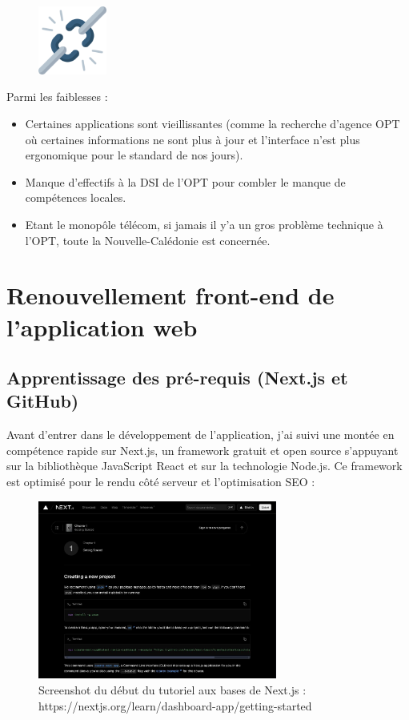 \documentclass[12pt,a4paper]{report}
\begin{document}
\vspace{1cm}
\begin{figure}[h] %
    \centering
    \includegraphics[width=0.2\textwidth]{ressources_rapport/faiblesses.png}
\end{figure}
Parmi les faiblesses : 
\begin{itemize}
    \item Certaines applications sont vieillissantes (comme la recherche d'agence OPT où certaines informations ne sont plus à jour et l'interface n'est plus ergonomique pour le standard de nos jours).
    \item Manque d'effectifs à la DSI de l'OPT pour combler le manque de compétences locales.
    \item Etant le monopôle télécom, si jamais il y'a un gros problème technique à l'OPT, toute la Nouvelle-Calédonie est concernée.
\end{itemize}

\chapter{Renouvellement front-end de l'application web}
\section{Apprentissage des pré-requis (Next.js et GitHub)}
Avant d’entrer dans le développement de l'application, j’ai suivi une montée en compétence rapide sur Next.js, un framework gratuit et open source s'appuyant sur la bibliothèque JavaScript React et sur la technologie Node.js. Ce framework est optimisé pour le rendu côté serveur et l’optimisation SEO : 

\vspace{1cm}
\begin{figure}[h] %
    \centering
    \includegraphics[width=0.7\textwidth]{ressources_rapport/learn_next.JPG}
    \caption{Screenshot du début du tutoriel aux bases de Next.js : https://nextjs.org/learn/dashboard-app/getting-started}
\end{figure}
\end{document}
